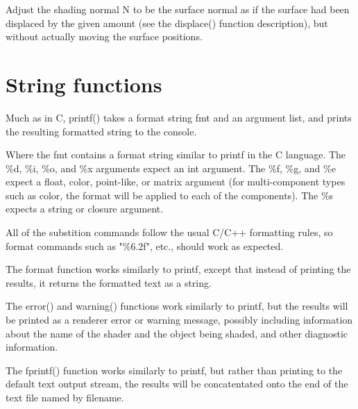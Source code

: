 \documentclass[11pt,letterpaper]{book}
\def\color{{\cf color}\xspace}
\def\float{{\cf float}\xspace}
\def\matrix{{\cf matrix}\xspace}
\def\N{{\cf N}\xspace}
\begin{document}

Adjust the shading normal \N to be the surface normal as if the
surface had been displaced by the given amount (see the {\cf displace()}
function description), but without actually moving the surface
positions.
\apiend


\section{String functions}
\label{sec:stdlib:string}


Much as in C, {\cf printf()} takes a format string {\cf fmt} and an
argument list, and prints the resulting formatted string to the console.

Where the {\cf fmt} contains a format string similar to {\cf printf} in
the C language. The {\cf \%d}, {\cf \%i}, {\cf \%o}, and {\cf \%x}
arguments expect an {\cf int} argument.  The {\cf \%f}, {\cf \%g}, and
{\cf \%e} expect a \float, \color, point-like, or \matrix argument (for
multi-component types such as \color, the format will be applied to each
of the components).  The {\cf \%s} expects a {\cf string} or 
{\cf closure} argument.

All of the substition commands follow the usual C/C++ formatting rules,
so format commands such as {\cf "\%6.2f"}, etc., should work as
expected.
\apiend

The {\cf format} function works similarly to {\cf printf}, except that
instead of printing the results, it returns the formatted text as a
{\cf string}.
\apiend

 
The {\cf error()} and {\cf warning()} functions work similarly to {\cf printf}, but the
results will be printed as a renderer error or warning message, possibly including
information about the name of the shader and the object being shaded,
and other diagnostic information.
\apiend

The {\cf fprintf()} function works similarly to {\cf printf}, but rather
than printing to the default text output stream, the results will be
concatentated onto the end of the text file named by {\cf filename}.
\apiend
\end{document}
